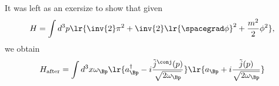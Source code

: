 

It was left as an exersize to show that given
\begin{dmath}\label{eqn:qftLecture13:120}
H = \int d^3 p \lr{ \inv{2} \pi^2 + \inv{2} \lr{ \spacegrad \phi}^2 + \frac{m^2}{2} \phi^2 },
\end{dmath}
we obtain
\begin{dmath}\label{eqn:qftLecture13:140}
H_{\text{after}} =
\int d^3 x \omega_\Bp
\lr{ a_\Bp^\dagger - i \frac{\tilde{j}^\conj(p)}{\sqrt{2 \omega_\Bp}} }
\lr{ a_\Bp + i \frac{\tilde{j}(p)}{\sqrt{2 \omega_\Bp}} }
\end{dmath}


